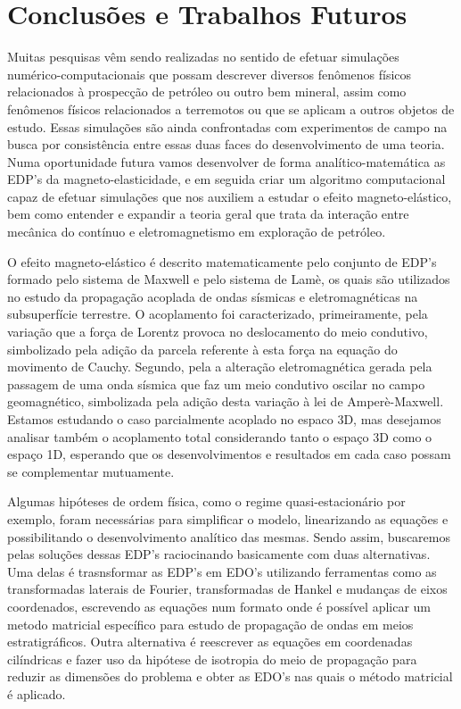 \chapter{Conclusões e Trabalhos Futuros}

Muitas pesquisas v\^em sendo realizadas no sentido de efetuar simula\c{c}\~oes num\'erico-computacionais que possam descrever diversos fen\^omenos f\'isicos relacionados \`a prospec\c{c}\~ao de petr\'oleo ou outro bem mineral, assim como fen\^omenos f\'isicos relacionados a terremotos ou que se aplicam a outros objetos de estudo. Essas simula\c{c}\~oes s\~ao ainda confrontadas com experimentos de campo na busca por consist\^encia entre essas duas faces do desenvolvimento de uma teoria. Numa oportunidade futura vamos desenvolver de forma anal\'itico-matem\'atica as EDP's da magneto-elasticidade,  e em seguida criar um algoritmo computacional capaz de efetuar simula\c{c}\~oes que nos auxiliem a estudar o efeito magneto-el\'astico, bem como entender e expandir a teoria geral que trata da intera\c{c}\~ao entre mec\^anica do cont\'inuo e eletromagnetismo em explora\c{c}\~ao de petr\'oleo.

O efeito magneto-el\'astico \'e descrito matematicamente pelo conjunto de EDP's formado pelo sistema de Maxwell e pelo sistema de Lam\`e, os quais s\~ao utilizados no estudo da propaga\c{c}\~ao acoplada de ondas s\'ismicas e eletromagn\'eticas na subsuperf\'icie terrestre. O acoplamento foi caracterizado, primeiramente, pela varia\c{c}\~ao que a for\c{c}a de Lorentz provoca no deslocamento do meio condutivo, simbolizado pela adi\c{c}\~ao da parcela referente \`a esta for\c{c}a na equa\c{c}\~ao do movimento de Cauchy. Segundo, pela a altera\c{c}\~ao eletromagn\'etica gerada pela passagem de uma onda s\'ismica que faz um meio condutivo oscilar no campo geomagn\'etico, simbolizada pela adi\c{c}\~ao desta varia\c{c}\~ao \`a lei de Amper\`e-Maxwell. Estamos estudando o caso parcialmente acoplado no espaco 3D, mas desejamos analisar tamb\'em o acoplamento total considerando tanto o espa\c{c}o 3D como o espa\c{c}o 1D, esperando que os desenvolvimentos e resultados em cada caso possam se complementar mutuamente.

Algumas hip\'oteses de ordem f\'isica, como o regime quasi-estacion\'ario por exemplo, foram necess\'arias para simplificar o modelo, linearizando as equa\c{c}\~oes e possibilitando o desenvolvimento anal\'itico das mesmas. Sendo assim, buscaremos pelas solu\c{c}\~oes dessas EDP's raciocinando basicamente com duas alternativas. Uma delas \'e trasnsformar as EDP's em EDO's utilizando ferramentas como as transformadas laterais de Fourier, transformadas de Hankel e mudan\c{c}as de eixos coordenados, escrevendo as equa\c{c}\~oes num formato onde \'e poss\'ivel aplicar um metodo matricial espec\'ifico para estudo de propaga\c{c}\~ao de ondas em meios estratigr\'aficos. Outra alternativa \'e reescrever as equa\c{c}\~oes em coordenadas cil\'indricas e fazer uso da hip\'otese de isotropia do meio de propaga\c{c}\~ao para reduzir as dimens\~oes do problema e obter as EDO's nas quais o m\'etodo matricial \'e aplicado.